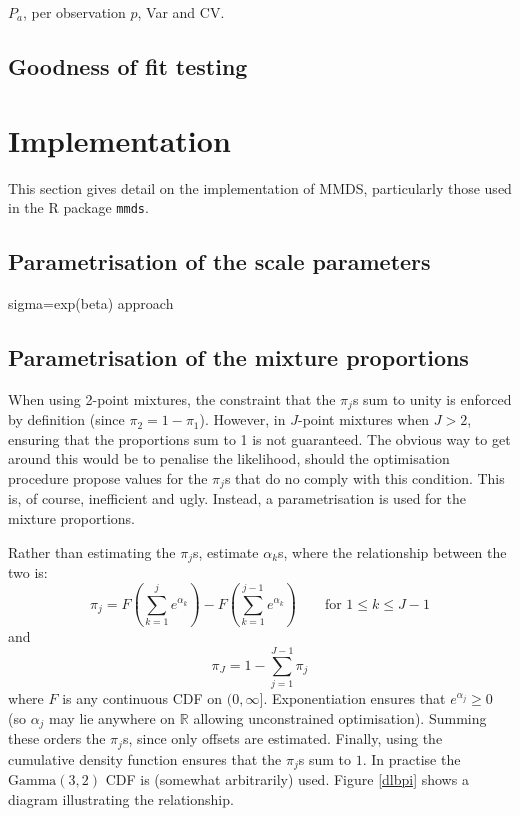 $P_a$, per observation $p$, Var and CV.

\subsection{Goodness of fit testing}





\section{Implementation}
This section gives detail on the implementation of MMDS, particularly those used in the \textsf{R} package \texttt{mmds}.

\subsection{Parametrisation of the scale parameters}
sigma=exp(beta) approach


\subsection{Parametrisation of the mixture proportions}
When using 2-point mixtures, the constraint that the $\pi_j$s sum to unity is enforced by definition (since $\pi_2=1-\pi_1$). However, in $J$-point mixtures when $J>2$, ensuring that the proportions sum to 1 is not guaranteed. The obvious way to get around this would be to penalise the likelihood, should the optimisation procedure propose values for the $\pi_j$s that do no comply with this condition. This is, of course, inefficient and ugly. Instead, a parametrisation is used for the mixture proportions.

Rather than estimating the $\pi_j$s, estimate $\alpha_k$s, where the relationship between the two is:
\begin{equation*}
\pi_j = F(\sum_{k=1}^j e^{\alpha_k}) - F(\sum_{k=1}^{j-1} e^{\alpha_k}) \qquad \text{for } 1\leq k \leq J-1
\end{equation*}
and
\begin{equation*}
\pi_J = 1-\sum_{j=1}^{J-1} \pi_j
\end{equation*}
where $F$ is any continuous CDF on $(0,\infty]$. Exponentiation ensures that $e^{\alpha_j}\geq0$ (so $\alpha_j$ may lie anywhere on $\mathbb{R}$ allowing unconstrained optimisation). Summing these orders the $\pi_j$s, since only offsets are estimated. Finally, using the cumulative density function ensures that the $\pi_j$s sum to $1$. In practise the $\text{Gamma}(3,2)$ CDF is (somewhat arbitrarily) used. Figure \ref{dlbpi} shows a diagram illustrating the relationship.

